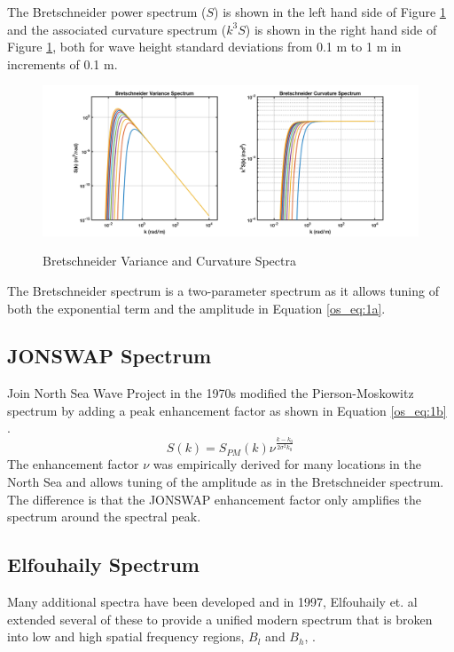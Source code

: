 The Bretschneider power spectrum ($S$) is shown in the left hand side of Figure \ref{os_fig:1a} and the associated curvature spectrum ($k^3S$) is shown in the right hand side of Figure \ref{os_fig:1a}, both for wave height standard deviations from 0.1 m to 1 m in increments of 0.1 m.

 \begin{figure}[H]
  \begin{center}
\includegraphics[width=6in]{../media/Ocean_Surface/bs_variance_curvature_spectrum.png}
  \end{center}
  \renewcommand{\baselinestretch}{1} \small\normalsize
  \begin{quote}
    \caption[Bretschneider Variance and Curvature Spectra]{Bretschneider Variance and Curvature Spectra\label{os_fig:1a}}
  \end{quote}
\end{figure}
 \renewcommand{\baselinestretch}{2} \small\normalsize
The Bretschneider spectrum is a two-parameter spectrum as it allows tuning of both the exponential term and the amplitude in Equation \ref{os_eq:1a}.

\subsection{JONSWAP Spectrum}
Join North Sea Wave Project in the 1970s modified the Pierson-Moskowitz spectrum by adding a peak enhancement factor as shown in Equation \ref{os_eq:1b} \cite{michel_sea_spectra}.
\begin{equation}
  \label{os_eq:1b}
  S(k) = S_{PM}(k)\nu^{\frac{k-k_0}{2\sigma^2k_0}} 
  \end{equation}
The enhancement factor $\nu$ was empirically derived for many locations in the North Sea and allows tuning of the amplitude as in the Bretschneider spectrum. The difference is that the JONSWAP enhancement factor only amplifies the spectrum around the spectral peak.

\subsection{Elfouhaily Spectrum}
Many additional spectra have been developed and in 1997, Elfouhaily et. al extended several of these to provide a unified modern spectrum that is broken into low and high spatial frequency regions, $B_l$ and $B_h$, \cite{elfouhaily}. 

